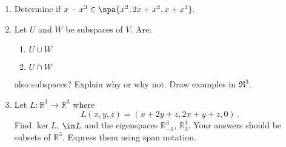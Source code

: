 


\begin{enumerate}


\item \label{subspaces_spanning_sets_polynolmial_span} {Determine} if  
$x-x^3 \in \spa\{ x^2, 2x+x^2, x+x^3 \}.$


\item\label{UandV} \hypertarget{intersections}{Let} $U$ and $W$ be subspaces of $V$.  Are:
\label{UcapV}
\begin{enumerate}
\item $U\cup W$
\item $U\cap W$
\end{enumerate}
also subspaces?  Explain why or why not.  Draw examples in $\Re^3$.



\item Let $L:{\mathbb R}^3\to {\mathbb R}^3$ where \[L(x,y,z)=(x+2y+z,2x+y+z,0)\, .\] 
Find $\ker L$, $\im L$ and the eigenspaces ${\mathbb R}^3_{-1}$, ${\mathbb R}^3_{3}$. Your answers should be subsets of ${\mathbb R}^3$. Express them using span notation.

\end{enumerate}

